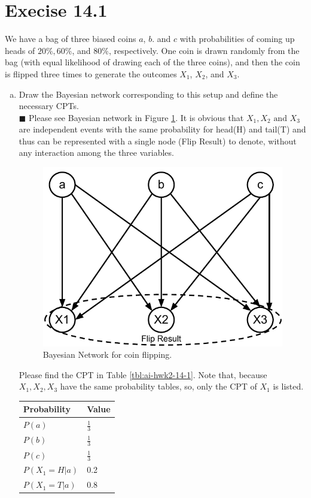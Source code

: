 \documentclass{article}
\newcommand{\solution}[1]{~\\ $\blacksquare$ \sffamily\upshape\selectfont #1
\normalfont ~\\~ }
\begin{document}
\section{Execise 14.1}
We have a bag of three biased coins $a$, $b$. and $c$ with
probabilities of coming up heads of $20\%, 60\%$, and $80\%$,
respectively. One coin is drawn randomly from the bag (with equal
likelihood of drawing each of the three coins), and then the coin is
flipped three times to generate the outcomes $X_1$, $X_2$, and $X_3$.
\begin{enumerate}[a.]
\item Draw the Bayesian network corresponding to this setup and define
  the necessary CPTs. 
  \solution{
    Please see Bayesian network in Figure \ref{fig:14_1}. It is
    obvious that $X_1,X_2 \mbox{ and } X_3$ are independent events
    with the same probability for head(H) and tail(T) and thus
    can be represented with a single node (Flip Result) to denote,
    without any interaction among the three variables. 
    \begin{figure}[ht]
      \centering
      \includegraphics[width=.5\textwidth]{AI-HWK-2_14_1.pdf}
      \caption{Bayesian Network for coin flipping.}\label{fig:14_1}
    \end{figure}
    Please find the CPT in Table \ref{tbl:ai-hwk2-14-1}. Note that,
    because $X_1,X_2,X_3$ have the same probability tables, so, only
    the CPT of $X_1$ is listed. 
  \begin{table}[h]
    \centering
    \begin{tabular}{l|l}
      \toprule
      \textbf{Probability} & \textbf{Value} \\ \toprule
      $P(a)$ & $\frac{1}{3}$ \\ \midrule
      $P(b)$ & $\frac{1}{3}$ \\ \midrule
      $P(c)$ & $\frac{1}{3}$ \\ \midrule
      $P(X_1=H|a)$ & 0.2 \\ \midrule
      $P(X_1=T|a)$ & 0.8 \\ \midrule

\end{tabular}
\end{table}}
\end{enumerate}
\end{document}
